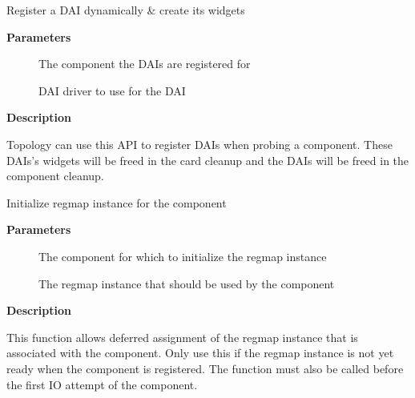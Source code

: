 \documentclass[a4paper,8pt,english]{sphinxmanual}
\begin{document}
\begin{fulllineitems}
\label{sound/kernel-api/alsa-driver-api:c.snd_soc_register_dai}
Register a DAI dynamically \& create its widgets

\end{fulllineitems}


\textbf{Parameters}
\begin{description}
\item[{}] \leavevmode
The component the DAIs are registered for

\item[{}] \leavevmode
DAI driver to use for the DAI

\end{description}

\textbf{Description}

Topology can use this API to register DAIs when probing a component.
These DAIs's widgets will be freed in the card cleanup and the DAIs
will be freed in the component cleanup.

\begin{fulllineitems}
\label{sound/kernel-api/alsa-driver-api:c.snd_soc_component_init_regmap}
Initialize regmap instance for the component

\end{fulllineitems}


\textbf{Parameters}
\begin{description}
\item[{}] \leavevmode
The component for which to initialize the regmap instance

\item[{}] \leavevmode
The regmap instance that should be used by the component

\end{description}

\textbf{Description}

This function allows deferred assignment of the regmap instance that is
associated with the component. Only use this if the regmap instance is not
yet ready when the component is registered. The function must also be called
before the first IO attempt of the component.
\end{document}
